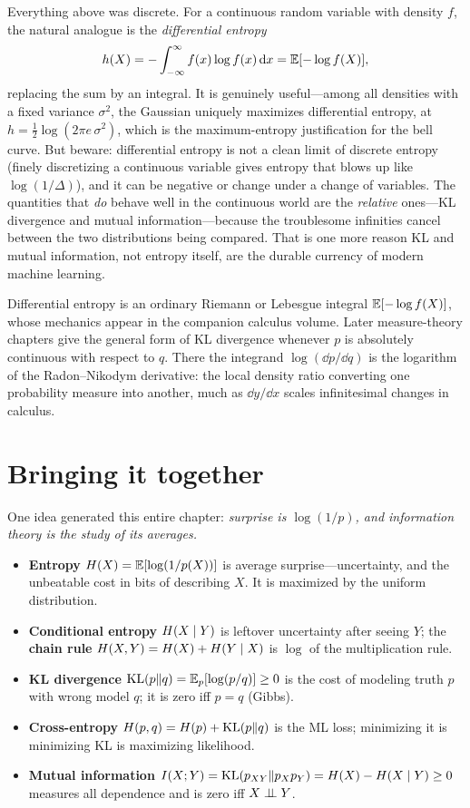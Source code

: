 Everything above was discrete. For a continuous random variable with density $f$, the natural analogue is
the \emph{differential entropy}
\[
  h(X) = -\int_{-\infty}^{\infty} f(x)\log f(x)\,\mathrm{d} x = \operatorname{\mathbb{E}}[-\log f(X)],
\]
replacing the sum by an integral. It is genuinely useful---among all densities with a fixed variance
$\sigma^2$, the Gaussian uniquely maximizes differential entropy, at $h = \tfrac12\log(2\pi e\,\sigma^2)$,
which is the maximum-entropy justification for the bell curve. But beware: differential entropy is not a
clean limit of discrete entropy (finely discretizing a continuous variable gives entropy that blows up
like $\log(1/\Delta)$), and it can be negative or change under a change of variables. The quantities that
\emph{do} behave well in the continuous world are the \emph{relative} ones---KL divergence and mutual
information---because the troublesome infinities cancel between the two distributions being compared. That
is one more reason KL and mutual information, not entropy itself, are the durable currency of modern
machine learning.

\begin{connectionbox}
Differential entropy is an ordinary Riemann or Lebesgue integral $\operatorname{\mathbb{E}}[-\log f(X)]$, whose
mechanics appear in the companion calculus volume. Later measure-theory chapters give the
general form of KL divergence whenever $p$ is absolutely continuous with respect to $q$.
There the integrand $\log(\dd p/\dd q)$ is the logarithm of the Radon--Nikodym derivative:
the local density ratio converting one probability measure into another, much as
$\dd y/\dd x$ scales infinitesimal changes in calculus.
\end{connectionbox}

\section{Bringing it together}
\label{ch33:summary}

One idea generated this entire chapter: \emph{surprise is $\log(1/p)$, and information theory is the study
of its averages.}

\begin{itemize}
  \item \textbf{Entropy} $H(X) = \operatorname{\mathbb{E}}[\log(1/p(X))]$ is average surprise---uncertainty, and the
        unbeatable cost in bits of describing $X$. It is maximized by the uniform distribution.
  \item \textbf{Conditional entropy} $H(X\mid Y)$ is leftover uncertainty after seeing $Y$; the
        \textbf{chain rule} $H(X,Y) = H(X) + H(Y\mid X)$ is $\log$ of the multiplication rule.
  \item \textbf{KL divergence} $\operatorname{KL}(p\|q) = \operatorname{\mathbb{E}}_p[\log(p/q)] \ge 0$ is the cost of modeling truth $p$ with
        wrong model $q$; it is zero iff $p=q$ (Gibbs).
  \item \textbf{Cross-entropy} $H(p,q) = H(p) + \operatorname{KL}(p\|q)$ is the ML loss; minimizing it is minimizing KL
        is maximizing likelihood.
  \item \textbf{Mutual information} $I(X;Y) = \operatorname{KL}(p_{XY}\|p_Xp_Y) = H(X) - H(X\mid Y) \ge 0$ measures
        all dependence and is zero iff $X\perp\!\!\!\perp Y$.
\end{itemize}

